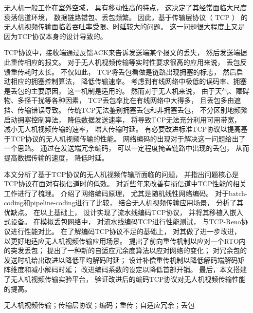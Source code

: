 \cabstract
{
	无人机一般工作在室外空域，
	具有移动性高的特点，
	这决定了其经常面临大尺度衰落信道环境，
	数据链路错包、丢包频繁。
	因此，基于传输层协议（ TCP ） 的无人机视频传输面临着吞吐率受限、时延较大的问题。
	这一问题很大程度上又是因为TCP协议本身的设计导致的。
	\par
	TCP协议中，接收端通过反馈ACK来告诉发送端某个报文的丢失，
	然后发送端据此重传相应的报文。
	对于无人机视频传输等实时性要求很高的应用来说，
	丢包反馈重传耗时太长。
	不仅如此，
	TCP将丢包看做是链路出现拥塞的标志，
	然后启动相应的拥塞控制算法，
	降低传输速率。
	考虑到有线网络中极低的误码率、拥塞是丢包的主要原因，
	这一机制是适用的。
	然而对于无人机来说，
	由于天气、障碍物、多径干扰等各种因素，
	TCP丢包率比在有线网络中大得多，
	且丢包多由遮挡、传输错误导致。
	传统TCP无法鉴别拥塞丢包和非拥塞丢包，
	不分区别地频繁启动拥塞控制算法，
	降低数据发送速率，
	将导致TCP无法充分利用可用带宽，
	减小无人机视频传输的速率，
	增大传输时延。
	有必要改进标准TCP协议以提高基于TCP协议的无人机视频传输的性能。
	网络编码的出现对于解决这一问题给出了一个思路。
	通过在发送端冗余编码，
	可以一定程度掩盖链路中出现的丢包，
	从而提高数据传输的速度，
	降低时延。
	\par
	本文分析了基于TCP协议的无人机视频传输所面临的问题，
	并指出问题核心是TCP协议在面对有损信道时的低效。
	对近些年来改善有损信道中TCP性能的相关工作进行了梳理。
	介绍了网络编码原理，
	尤其是随机线性网络编码。
	对于batch-coding和pipeline-coding进行了比较，
	结合无人机视频传输应用场景，
	分析了其优缺点。
	在以上基础上，
	设计实现了流水线编码TCP协议，
	并将其移植入嵌入式设备。
	在模拟丢包网络中，
	对流水线编码TCP进行性能测试，
	与TCP-Reno协议进行性能对比。
	在了解编码TCP协议不足的基础上，
	对其做了进一步改进，
	以更好地适应无人机视频传输应用场景。
	提出了前向重传机制以应对一个RTO内的突发丢包；
	提出了一种新的自适应冗余度算法以应对网络的变化；
	对冗余包的发送时机给出改进以降低平均解码时延；
	设计补偿重传机制以降低解码端解码矩阵维度和减小解码时延；
	改进编码系数的设定以降低首部开销。
	最后，本文搭建了无人机视频传输实验平台，
	验证改进后的编码TCP协议对无人机视频传输性能的提高。
	\par
	
}
{无人机视频传输；传输层协议；编码；重传；自适应冗余；丢包} 	%